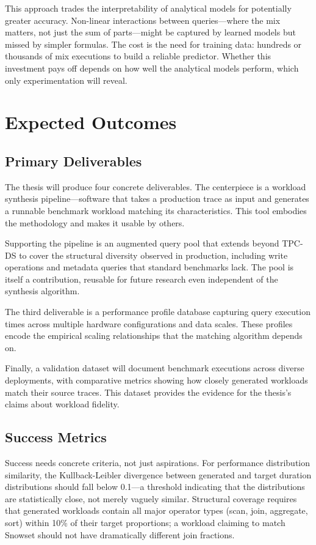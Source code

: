 \documentclass[12pt]{report}
\begin{document}
This approach trades the interpretability of analytical models for potentially greater accuracy. Non-linear interactions between queries---where the mix matters, not just the sum of parts---might be captured by learned models but missed by simpler formulas. The cost is the need for training data: hundreds or thousands of mix executions to build a reliable predictor. Whether this investment pays off depends on how well the analytical models perform, which only experimentation will reveal.

\section{Expected Outcomes}
\label{sec:outcomes}

\subsection{Primary Deliverables}
\label{subsec:deliverables}

The thesis will produce four concrete deliverables. The centerpiece is a workload synthesis pipeline---software that takes a production trace as input and generates a runnable benchmark workload matching its characteristics. This tool embodies the methodology and makes it usable by others.

Supporting the pipeline is an augmented query pool that extends beyond TPC-DS to cover the structural diversity observed in production, including write operations and metadata queries that standard benchmarks lack. The pool is itself a contribution, reusable for future research even independent of the synthesis algorithm.

The third deliverable is a performance profile database capturing query execution times across multiple hardware configurations and data scales. These profiles encode the empirical scaling relationships that the matching algorithm depends on.

Finally, a validation dataset will document benchmark executions across diverse deployments, with comparative metrics showing how closely generated workloads match their source traces. This dataset provides the evidence for the thesis's claims about workload fidelity.

\subsection{Success Metrics}
\label{subsec:success-metrics}

Success needs concrete criteria, not just aspirations. For performance distribution similarity, the Kullback-Leibler divergence between generated and target duration distributions should fall below 0.1---a threshold indicating that the distributions are statistically close, not merely vaguely similar. Structural coverage requires that generated workloads contain all major operator types (scan, join, aggregate, sort) within 10\% of their target proportions; a workload claiming to match Snowset should not have dramatically different join fractions.
\end{document}
